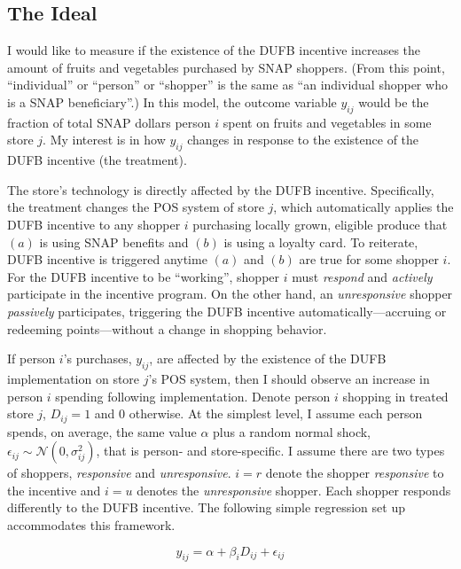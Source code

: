 \documentclass[12pt,letterpaperpaper,]{book}
\begin{document}
\subsection*{The Ideal}\label{the-ideal}

I would like to measure if the existence of the DUFB incentive increases
the amount of fruits and vegetables purchased by SNAP shoppers. (From
this point, ``individual'' or ``person'' or ``shopper'' is the same as
``an individual shopper who is a SNAP beneficiary''.) In this model, the
outcome variable \(y_{ij}\) would be the fraction of total SNAP dollars
person \(i\) spent on fruits and vegetables in some store \(j\). My
interest is in how \(y_{ij}\) changes in response to the existence of
the DUFB incentive (the treatment).

The store's technology is directly affected by the DUFB incentive.
Specifically, the treatment changes the POS system of store \(j\), which
automatically applies the DUFB incentive to any shopper \(i\) purchasing
locally grown, eligible produce that \((a)\) is using SNAP benefits and
\((b)\) is using a loyalty card. To reiterate, DUFB incentive is
triggered anytime \((a)\) and \((b)\) are true for some shopper \(i\).
For the DUFB incentive to be ``working'', shopper \(i\) must
\emph{respond} and \emph{actively} participate in the incentive program.
On the other hand, an \emph{unresponsive} shopper \emph{passively}
participates, triggering the DUFB incentive automatically---accruing or
redeeming points---without a change in shopping behavior.

If person \(i\)'s purchases, \(y_{ij}\), are affected by the existence
of the DUFB implementation on store \(j\)'s POS system, then I should
observe an increase in person \(i\) spending following implementation.
Denote person \(i\) shopping in treated store \(j\), \(D_{ij}=1\) and
\(0\) otherwise. At the simplest level, I assume each person spends, on
average, the same value \(\alpha\) plus a random normal shock,
\(\epsilon_{ij} \sim \mathcal{N}(0, \sigma_{ij}^2)\), that is person-
and store-specific. I assume there are two types of shoppers,
\emph{responsive} and \emph{unresponsive}. \(i = r\) denote the shopper
\emph{responsive} to the incentive and \(i = u\) denotes the
\emph{unresponsive} shopper. Each shopper responds differently to the
DUFB incentive. The following simple regression set up accommodates this
framework.

\[
  y_{ij} = \alpha + \beta_i D_{ij} + \epsilon_{ij}
\]
\end{document}
